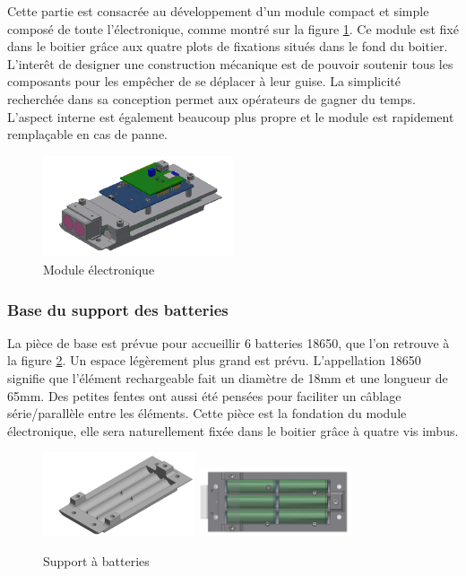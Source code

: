 Cette partie est consacrée au développement d’un module compact et simple composé de toute l'électronique, 
comme montré sur la figure \ref{fig:elmodule}.
Ce module est fixé dans le boitier grâce aux quatre plots de fixations situés dans le fond 
du boitier. L’interêt de designer une construction mécanique est de pouvoir soutenir tous les composants 
pour les empêcher de se déplacer à leur guise. La simplicité recherchée dans sa conception permet
aux opérateurs de gagner du temps. L'aspect interne est également beaucoup plus propre et le module est
rapidement remplaçable en cas de panne.

\begin{figure}[H]
    \centering
    \includegraphics[width=0.5\textwidth]{Images/photos_PGA/ModuleElec2-removebg-preview.png}
    \caption{Module électronique}
    \label{fig:elmodule}
\end{figure}

\subsubsection{Base du support des batteries}

La pièce de base est prévue pour accueillir 6 batteries 18650, que l'on retrouve à la figure \ref{fig:supportbatteries}.
Un espace légèrement plus grand est 
prévu. L’appellation 18650 signifie que l’élément rechargeable fait un diamètre de 18mm et une longueur 
de 65mm. Des petites fentes ont aussi été pensées pour faciliter un câblage série/parallèle entre les 
éléments. Cette pièce est la fondation du module électronique, elle sera naturellement fixée dans le 
boitier grâce à quatre vis imbus.

\begin{figure}[H]
    \centering
    \includegraphics[width=0.4\textwidth]{Images/photos_PGA/moduleFondbat.PNG}
    \includegraphics[width=0.4\textwidth]{Images/photos_PGA/bateriebl.PNG}
    \caption{Support à batteries}
    \label{fig:supportbatteries}
\end{figure}

